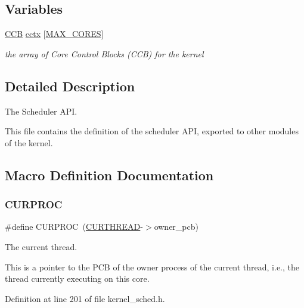 \subsection*{Variables}
\begin{DoxyCompactItemize}
\item 
\mbox{\label{group__scheduler_ga3be3b151b275926dff3fb99bee765eab}} 
\hyperlink{group__scheduler_ga7485b31e0dd9fd723bc2d75fba5206a0}{C\+CB} \hyperlink{group__scheduler_ga3be3b151b275926dff3fb99bee765eab}{cctx} \mbox{[}\hyperlink{bios_8h_a009855593b59738d24dbfc236edb3b14}{M\+A\+X\+\_\+\+C\+O\+R\+ES}\mbox{]}
\begin{DoxyCompactList}\small\item\em the array of Core Control Blocks (C\+CB) for the kernel \end{DoxyCompactList}\end{DoxyCompactItemize}


\subsection{Detailed Description}
The Scheduler A\+PI. 

This file contains the definition of the scheduler A\+PI, exported to other modules of the kernel. 

\subsection{Macro Definition Documentation}
\mbox{\label{group__scheduler_gae3437e8e6787ef05b6576d03c5b6a0ca}} 
\subsubsection{\texorpdfstring{C\+U\+R\+P\+R\+OC}{CURPROC}}
{\footnotesize\ttfamily \#define C\+U\+R\+P\+R\+OC~(\hyperlink{group__scheduler_ga587a82c8931f0df72f43cc913ceb7e27}{C\+U\+R\+T\+H\+R\+E\+AD}-\/$>$owner\+\_\+pcb)}



The current thread. 

This is a pointer to the P\+CB of the owner process of the current thread, i.\+e., the thread currently executing on this core. 

Definition at line 201 of file kernel\+\_\+sched.\+h.

